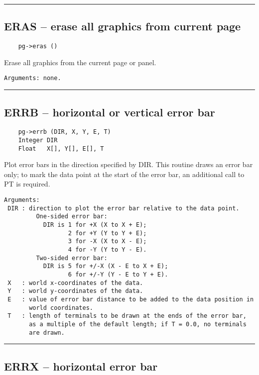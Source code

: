 \hrule

\subsection*{ERAS -- erase all graphics from current page }

\begin{verbatim}
    pg->eras ()
\end{verbatim}

Erase all graphics from the current page or panel.

\begin{verbatim}
Arguments: none.
\end{verbatim}

\hrule

\subsection*{ERRB -- horizontal or vertical error bar }

\begin{verbatim}
    pg->errb (DIR, X, Y, E, T)
    Integer DIR
    Float   X[], Y[], E[], T
\end{verbatim}

Plot error bars in the direction specified by DIR.  This routine draws
an error bar only; to mark the data point at the start of the error
bar, an additional call to PT is required.

\begin{verbatim}
Arguments:
 DIR : direction to plot the error bar relative to the data point.
         One-sided error bar:
           DIR is 1 for +X (X to X + E);
                  2 for +Y (Y to Y + E);
                  3 for -X (X to X - E);
                  4 for -Y (Y to Y - E).
         Two-sided error bar:
           DIR is 5 for +/-X (X - E to X + E);
                  6 for +/-Y (Y - E to Y + E).
 X   : world x-coordinates of the data.
 Y   : world y-coordinates of the data.
 E   : value of error bar distance to be added to the data position in
       world coordinates. 
 T   : length of terminals to be drawn at the ends of the error bar,
       as a multiple of the default length; if T = 0.0, no terminals
       are drawn. 
\end{verbatim}

\hrule

\subsection*{ERRX -- horizontal error bar }

